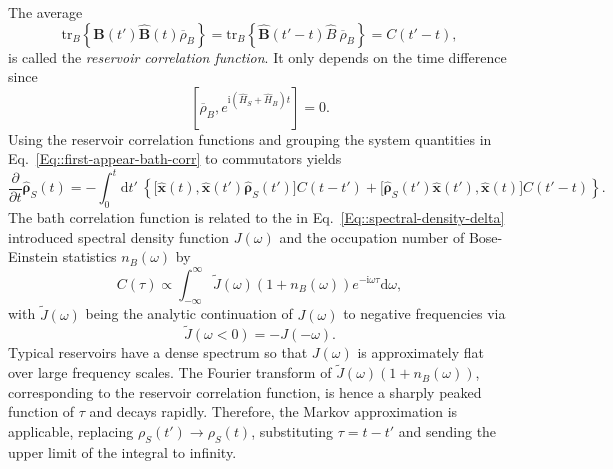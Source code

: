 	The average
	\begin{equation}
		\text{tr}_B \left\{ \hat{\boldsymbol{B}}(t') \boldsymbol{\hat{B}}(t)\overline{\rho}_B \right\} = \text{tr}_B \left\{ \hat{\boldsymbol{B}}(t' - t) {\hat{B}} ~ \overline{\rho}_B \right\} =	C(t' - t),
	\end{equation}
	is called the \textit{reservoir correlation function}. It only depends on the time difference since
	\begin{equation}
		\left[\overline{\rho}_B,	e^{\mathrm{i} \left(\hat{H}_S + \hat{H}_B\right)t} \right] =	0.
	\end{equation}
	Using the reservoir correlation functions and grouping the system quantities in Eq.~\eqref{Eq::first-appear-bath-corr} to commutators yields
	\begin{equation}
		\frac{\partial}{\partial t} \boldsymbol{\hat{\rho}}_S(t) =	- \int_{0}^{t} \text{d}t'~  \left\{\Big[\hat{\boldsymbol{x}}(t), \hat{\boldsymbol{x}}(t')\hat{\boldsymbol{\rho}}_S(t') \Big] C(t - t') + \Big[\hat{\boldsymbol{\rho}}_S(t') \hat{\boldsymbol{x}}(t'), \hat{\boldsymbol{x}}(t) \Big] C(t' - t) \right\}.
	\end{equation}
	The bath correlation function is related to the in Eq.~\eqref{Eq::spectral-density-delta} introduced spectral density function $J(\omega)$ and the occupation number of Bose-Einstein statistics $n_B(\omega)$ by 
	\begin{equation}
		C(\tau) \propto \int_{-\infty}^{\infty} \tilde{J}(\omega) ( 1 + n_B(\omega)) e^{-\mathrm{i}\omega \tau} \text{d} \omega,
	\end{equation}
	with $\tilde{J}(\omega)$ being the analytic continuation of $J(\omega)$ to negative frequencies via 
	\begin{equation}
			\tilde{J}(\omega < 0) =	- J(-\omega).
	\end{equation}
	Typical reservoirs have a dense spectrum so that $J(\omega)$ is approximately flat over large frequency scales. The Fourier transform of $\tilde{J}(\omega) ( 1 + n_B(\omega))$, corresponding to the reservoir correlation function, is hence a sharply peaked function of $\tau$ and decays rapidly. Therefore, the Markov approximation is applicable, replacing $\rho_S(t') \rightarrow \rho_S(t)$, substituting $\tau =	t - t'$ and sending the upper limit of the integral to infinity.
